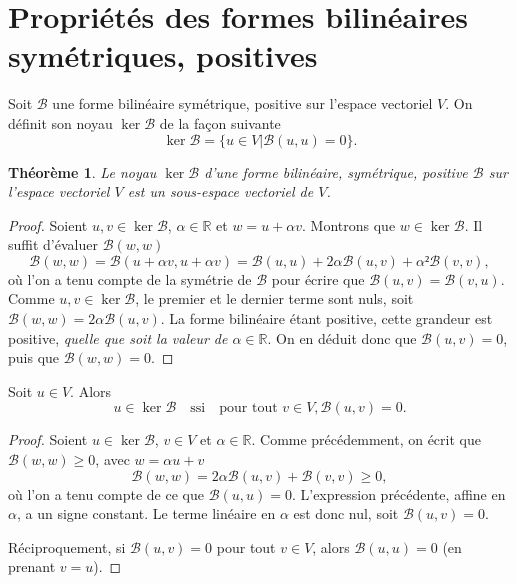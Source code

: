 \documentclass[12pt, final]{amsart}
\newtheorem{theorem}{Théorème}
\newcommand{\reals}{\mathbb{R}}
\begin{document}
\appendix

\section{Propriétés des formes bilinéaires symétriques, positives}

Soit \(\mathcal B\) une forme bilinéaire symétrique, positive sur l'espace vectoriel
\(V\). On définit son noyau \(\ker\mathcal B\) de la façon suivante
\begin{equation}
  \ker\mathcal B=\{u∈ V|\mathcal B(u, u)=0\}.
\end{equation}

\begin{theorem}
  Le noyau \(\ker\mathcal B\) d'une forme bilinéaire, symétrique, positive
  \(\mathcal B\) sur l'espace vectoriel \(V\) est un sous-espace vectoriel de
  \(V\).
\end{theorem}
\begin{proof}
  Soient \(u, v∈\ker\mathcal B\), \(\alpha∈\reals\) et \(w=u+\alpha
  v\). Montrons que \(w∈\ker\mathcal B\). Il suffit d'évaluer
  \(\mathcal B(w, w)\)
  \begin{equation}
    \mathcal B(w, w)=\mathcal B(u+\alpha v, u+\alpha v)=\mathcal B(u, u)+2\alpha\mathcal B(u, v)+\alpha²\mathcal B(v, v),
  \end{equation}
  où l'on a tenu compte de la symétrie de \(\mathcal B\) pour écrire que
  \(\mathcal B(u, v)=\mathcal B(v, u)\). Comme \(u, v∈\ker\mathcal B\), le
  premier et le dernier terme sont nuls, soit
  \(\mathcal B(w, w)=2\alpha\mathcal B(u, v)\). La forme bilinéaire étant
  positive, cette grandeur est positive, \emph{quelle que soit la valeur de
    \(\alpha∈\reals\)}. On en déduit donc que \(\mathcal B(u, v)=0\), puis
  que \(\mathcal B(w, w)=0\).
\end{proof}

Soit \(u∈ V\). Alors
\begin{equation}
  u∈\ker\mathcal B\quad\text{ssi}\quad\text{pour tout }v∈ V, \mathcal B(u, v)=0.
\end{equation}
\begin{proof}
  Soient \(u∈\ker\mathcal B\), \(v∈ V\) et \(\alpha∈\reals\). Comme
  précédemment, on écrit que \(\mathcal B(w, w)≥0\), avec \(w=\alpha u+v\)
  \begin{equation}
    \mathcal B(w, w)=2\alpha\mathcal B(u, v)+\mathcal B(v, v)≥0,
  \end{equation}
  où l'on a tenu compte de ce que \(\mathcal B(u, u)=0\). L'expression
  précédente, affine en \(\alpha\), a un signe constant. Le terme linéaire en
  \(\alpha\) est donc nul, soit \(\mathcal B(u, v)=0\).

  Réciproquement, si \(\mathcal B(u, v)=0\) pour tout \(v∈ V\), alors
  \(\mathcal B(u, u)=0\) (en prenant \(v=u\)).
\end{proof}
\end{document}

